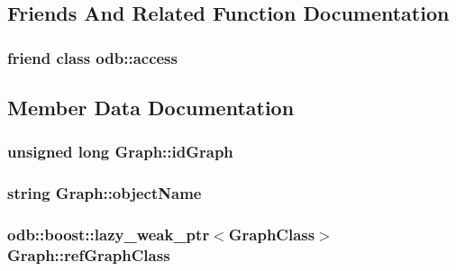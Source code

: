 \subsection{Friends And Related Function Documentation}
\hypertarget{class_graph_acb4d953abf85ae525f1d06a0c3a86a55}{}
\subsubsection[{odb\+::access}]{\setlength{\rightskip}{0pt plus 5cm}friend class odb\+::access\hspace{0.3cm}{\ttfamily [friend]}}\label{class_graph_acb4d953abf85ae525f1d06a0c3a86a55}


\subsection{Member Data Documentation}
\hypertarget{class_graph_a38e68fb578e310dab0ba05301369310e}{}
\subsubsection[{id\+Graph}]{\setlength{\rightskip}{0pt plus 5cm}unsigned long Graph\+::id\+Graph\hspace{0.3cm}{\ttfamily [private]}}\label{class_graph_a38e68fb578e310dab0ba05301369310e}
\hypertarget{class_graph_aba4917d4eeea87c7c548f6b222163ee2}{}
\subsubsection[{object\+Name}]{\setlength{\rightskip}{0pt plus 5cm}string Graph\+::object\+Name\hspace{0.3cm}{\ttfamily [private]}}\label{class_graph_aba4917d4eeea87c7c548f6b222163ee2}
\hypertarget{class_graph_ace96fffa12f49cb2a679ade6b2614bca}{}
\subsubsection[{ref\+Graph\+Class}]{\setlength{\rightskip}{0pt plus 5cm}odb\+::boost\+::lazy\+\_\+weak\+\_\+ptr$<${\bf Graph\+Class}$>$ Graph\+::ref\+Graph\+Class\hspace{0.3cm}{\ttfamily [private]}}\label{class_graph_ace96fffa12f49cb2a679ade6b2614bca}
\hypertarget{class_graph_a415a23d3eba4de597a9ec6d84f521014}{}
